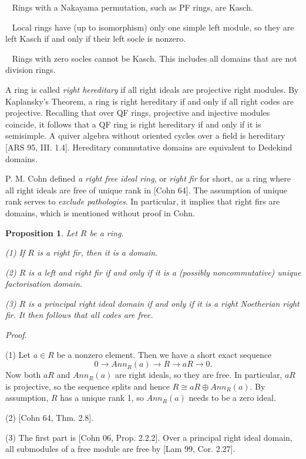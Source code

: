 \documentclass{article}
\theoremstyle{plain}
\newtheorem{Prop}[veta]{Proposition}
\theoremstyle{plain}
\theoremstyle{remark}
\theoremstyle{plain}
\newenvironment{dukaz}{
  \par\medskip \noindent
  \textit{Proof}.
}{

\rightline{$\qedsymbol$}
}
\begin{document}
\noindent      \textbullet~ Rings with a Nakayama permutation, such as PF rings, are Kasch.

\noindent \textbullet~ Local rings have (up to isomorphism) only one simple left module, so they are left Kasch if and only if their left socle is nonzero.

\noindent \textbullet~ Rings with zero socles cannot be Kasch. This includes all domains that are not division rings.    


 \medskip 


A ring is called \textit{right hereditary} if all right ideals are projective right modules. By Kaplansky's Theorem, a ring is right hereditary if and only if all right codes are projective. Recalling that over QF rings, projective and injective modules coincide, it follows that a QF ring is right hereditary if and only if it is semisimple. A quiver algebra without oriented cycles over a field is hereditary [ARS 95, III. 1.4]. Hereditary commutative domains are equivalent to Dedekind domains.

P. M. Cohn defined \textit{a right free ideal ring}, or \textit{right fir} for short, as a ring where all right ideals are free of unique rank in [Cohn 64]. The assumption of unique rank serves to \textit{exclude pathologies}. In particular, it implies that right firs are domains, which is mentioned without proof in Cohn. 

\begin{Prop} \label{Propfir} Let $R$ be a ring. 

(1) If $R$ is a right fir, then it is a domain.

(2) $R$ is a left and right fir if and only if it is a (possibly noncommutative) unique factorisation domain.

(3) $R$ is a principal right ideal domain if and only if it is a right Noetherian right fir.  It then follows that all codes are free.
\end{Prop}
\begin{dukaz}
    (1)      Let $a\in R$ be a nonzero element. Then we have a short exact sequence
    \[ 0 \to Ann_R(a) \to R\to aR\to 0. \]
    Now both $aR$ and $Ann_R(a)$ are right ideals, so they are free. In particular, $aR$ is projective, so the sequence splits and hence $R\cong aR \oplus Ann_R(a)$. By assumption, $R$ has a unique rank 1, so $Ann_R(a)$ needs to be a zero ideal.

(2)  [Cohn 64, Thm. 2.8].

(3) The first part is  [Cohn 06, Prop. 2.2.2]. Over a principal right ideal domain, all submodules of a free module are free by  [Lam 99, Cor. 2.27].
\end{dukaz}
\end{document}
